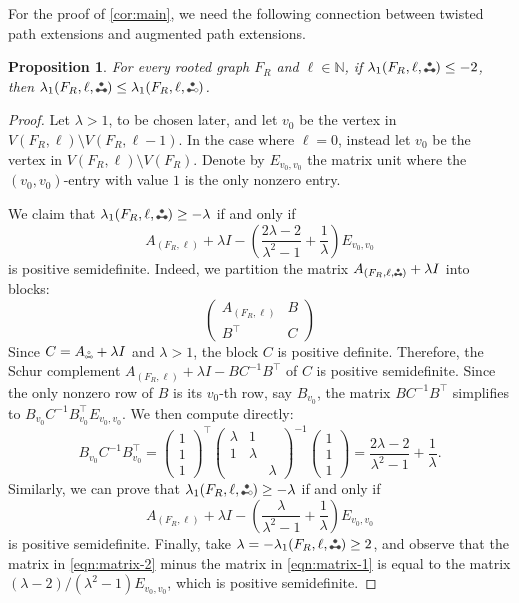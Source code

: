 \documentclass[11pt]{article}
\newtheorem{proposition}[theorem]{Proposition}
\theoremstyle{definition}
\theoremstyle{remark}
\newcommand{\la}{\lambda}
\newcommand{\N}{\mathbb{N}}
\newcommand{\T}{\intercal}
\newcommand{\etwo}{\tikz[baseline=-0.2ex, scale=0.9]{\draw[darkgray, thick] (0,0)--(0.2,0); \draw[darkgray, fill=darkgray] (0,0) circle (0.05); \draw[darkgray, fill=darkgray] (0.1,0.17320508075) circle (0.05); \draw[darkgray, fill=white] (0.2,0) circle (0.05);}}
\newcommand{\ftwo}{\tikz[baseline=-0.2ex, scale=0.9]{\draw[darkgray, thick] (0,0)--(0.2,0); \draw[darkgray, fill=darkgray] (0,0) circle (0.05); \draw[darkgray, fill=darkgray] (0.1,0.17320508075) circle (0.05); \draw[darkgray, fill=darkgray] (0.2,0) circle (0.05);}}
\newcommand{\ape}[1]{(#1,\etwo)}
\newcommand{\tpe}[1]{(#1,\ftwo)}
\newcommand{\tpesub}[1]{(#1,{\tikz[baseline=-0.2ex, scale=0.63]{\draw[darkgray, thick] (0,0)--(0.2,0); \draw[darkgray, fill=darkgray] (0,0) circle (0.05); \draw[darkgray, fill=darkgray] (0.1,0.17320508075) circle (0.05); \draw[darkgray, fill=darkgray] (0.2,0) circle (0.05);}})}
\newcommand{\etwographsub}{\tikz[baseline=-0.2ex, scale=0.63]{\draw[darkgray, thick] (0,0)--(0.2,0); \draw[darkgray, fill=white] (0,0) circle (0.05); \draw[darkgray, fill=white] (0.1,0.17320508075) circle (0.05); \draw[darkgray, fill=white] (0.2,0) circle (0.05);}}
\begin{document}
For the proof of \cref{cor:main}, we need the following connection between twisted path extensions and augmented path extensions.

\begin{proposition} \label{lem:tpe-vs-ape}
    For every rooted graph $F_R$ and $\ell \in \N$, if $\la_1\tpe{F_R, \ell} \le -2$, then $\la_1\tpe{F_R, \ell} \le \la_1\ape{F_R, \ell}$.
\end{proposition}

\begin{proof}
    Let $\la > 1$, to be chosen later, and let $v_0$ be the vertex in $V(F_R,\ell)\setminus V(F_R,\ell-1)$. In the case where $\ell = 0$, instead let $v_0$ be the vertex in $V(F_R,\ell)\setminus V(F_R)$. Denote by $E_{v_0,v_0}$ the matrix unit where the $(v_0,v_0)$-entry with value $1$ is the only nonzero entry.

    We claim that $\la_1\tpe{F_R, \ell} \ge -\la$ if and only if
    \begin{equation} \label{eqn:matrix-1}
        A_{(F_R,\ell)} + \la I - \left(\frac{2\la-2}{\la^2-1}+\frac{1}{\la}\right)E_{v_0,v_0}
    \end{equation} is positive semidefinite. Indeed, we partition the matrix $A_{\tpesub{F_R,\ell}}+\la I$ into blocks:
    \[\begin{pmatrix}
        A_{(F_R, \ell)} & B \\
        B^\T & C
    \end{pmatrix}\]
    Since $C = A_{\etwographsub} + \la I$ and $\la > 1$, the block $C$ is positive definite. Therefore, the Schur complement $A_{(F_R, \ell)} + \la I - BC^{-1}B^\T$ of $C$ is positive semidefinite. Since the only nonzero row of $B$ is its $v_0$-th row, say $B_{v_0}$, the matrix $BC^{-1}B^\T$ simplifies to $B_{v_0}C^{-1}B_{v_0}^\T E_{v_0,v_0}$. We then compute directly:
    \[
        B_{v_0}C^{-1}B_{v_0}^\T = \begin{pmatrix}
            1 \\ 1 \\ 1
        \end{pmatrix}^\T
        \begin{pmatrix}
            \la & 1 & \\
            1 & \la & \\
            & & \la
        \end{pmatrix}^{-1}
        \begin{pmatrix}
            1 \\ 1 \\ 1
        \end{pmatrix}
        =\frac{2\la-2}{\la^2-1}+\frac{1}{\la}.
    \]
    Similarly, we can prove that $\la_1\ape{F_R,\ell} \ge -\la$ if and only if
    \begin{equation} \label{eqn:matrix-2}
        A_{(F_R,\ell)} + \la I - \left(\frac{\la}{\la^2-1}+\frac{1}{\la}\right) E_{v_0,v_0}
    \end{equation}
    is positive semidefinite. Finally, take $\la = -\la_1\tpe{F_R,\ell} \ge 2$, and observe that the matrix in \eqref{eqn:matrix-2} minus the matrix in \eqref{eqn:matrix-1} is equal to the matrix $(\la-2)/(\la^2-1)E_{v_0,v_0}$, which is positive semidefinite.
\end{proof}
\end{document}
